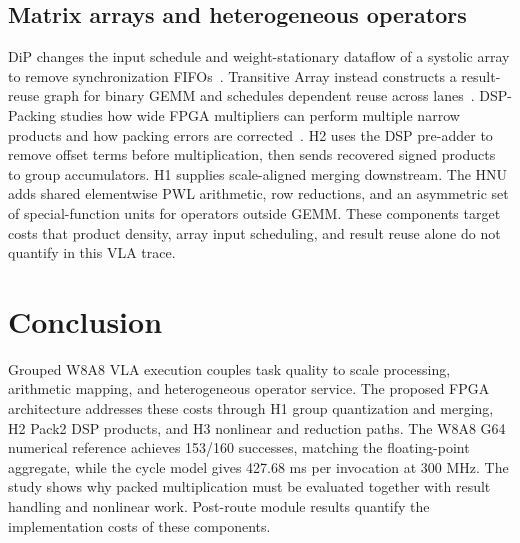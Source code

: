 \documentclass[journal,10pt]{IEEEtran}
\begin{document}
\subsection{Matrix arrays and heterogeneous operators}
DiP changes the input schedule and weight-stationary dataflow of a systolic array to remove synchronization FIFOs~\cite{abdelmaksoud2026dip}. Transitive Array instead constructs a result-reuse graph for binary GEMM and schedules dependent reuse across lanes~\cite{guo2025transitive}. DSP-Packing studies how wide FPGA multipliers can perform multiple narrow products and how packing errors are corrected~\cite{dsppacking}. H2 uses the DSP pre-adder to remove offset terms before multiplication, then sends recovered signed products to group accumulators. H1 supplies scale-aligned merging downstream. The HNU adds shared elementwise PWL arithmetic, row reductions, and an asymmetric set of special-function units for operators outside GEMM. These components target costs that product density, array input scheduling, and result reuse alone do not quantify in this VLA trace.

\section{Conclusion}
Grouped W8A8 VLA execution couples task quality to scale processing, arithmetic mapping, and heterogeneous operator service. The proposed FPGA architecture addresses these costs through H1 group quantization and merging, H2 Pack2 DSP products, and H3 nonlinear and reduction paths. The W8A8 G64 numerical reference achieves 153/160 successes, matching the floating-point aggregate, while the cycle model gives 427.68 ms per invocation at 300 MHz. The study shows why packed multiplication must be evaluated together with result handling and nonlinear work. Post-route module results quantify the implementation costs of these components.



\end{document}
